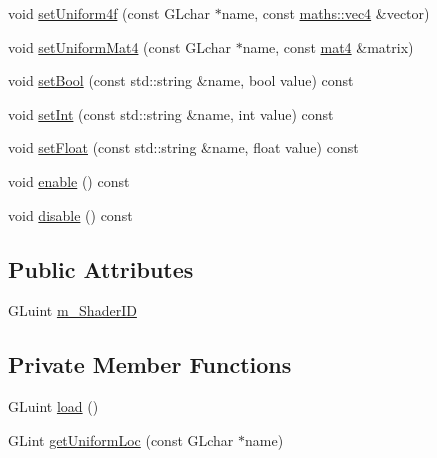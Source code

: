 \begin{DoxyCompactItemize}
\item 
void \hyperlink{classspork_1_1graphics_1_1_shader_a77b6c8294c146830f14a045db79a45a3}{set\+Uniform4f} (const G\+Lchar $\ast$name, const \hyperlink{structspork_1_1maths_1_1vec4}{maths\+::vec4} \&vector)
\item 
void \hyperlink{classspork_1_1graphics_1_1_shader_aad96559174940fa57823854c8fb37e7a}{set\+Uniform\+Mat4} (const G\+Lchar $\ast$name, const \hyperlink{structspork_1_1maths_1_1mat4}{mat4} \&matrix)
\item 
void \hyperlink{classspork_1_1graphics_1_1_shader_ad6b8581afbd17fa147249f64a6e63277}{set\+Bool} (const std\+::string \&name, bool value) const
\item 
void \hyperlink{classspork_1_1graphics_1_1_shader_ab45b2c3e18a9cd749415554c20798761}{set\+Int} (const std\+::string \&name, int value) const
\item 
void \hyperlink{classspork_1_1graphics_1_1_shader_a237454c02782f6466cc82d5c1e245d01}{set\+Float} (const std\+::string \&name, float value) const
\item 
void \hyperlink{classspork_1_1graphics_1_1_shader_a9f94f59d4beda122f51475dc7d7eda07}{enable} () const
\item 
void \hyperlink{classspork_1_1graphics_1_1_shader_a0218ebe5d0c83780e3680432fe99fb5a}{disable} () const
\end{DoxyCompactItemize}
\subsection*{Public Attributes}
\begin{DoxyCompactItemize}
\item 
G\+Luint \hyperlink{classspork_1_1graphics_1_1_shader_a408beae51c0bf176c8d598872e524a12}{m\+\_\+\+Shader\+ID}
\end{DoxyCompactItemize}
\subsection*{Private Member Functions}
\begin{DoxyCompactItemize}
\item 
G\+Luint \hyperlink{classspork_1_1graphics_1_1_shader_a24f95d4765321c8244726bcbe47c2bc3}{load} ()
\item 
G\+Lint \hyperlink{classspork_1_1graphics_1_1_shader_a421e7428713f0d5e33f50ef0e9650185}{get\+Uniform\+Loc} (const G\+Lchar $\ast$name)
\end{DoxyCompactItemize}
